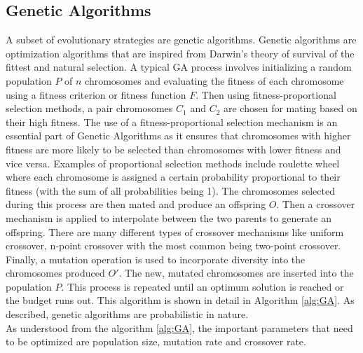 \documentclass{article}
\begin{document}
\subsection{Genetic Algorithms}
A subset of evolutionary strategies are genetic algorithms. Genetic algorithms are optimization algorithms that are inspired from Darwin's theory of survival of the fittest and natural selection. A typical GA process involves initializing a random population $P$ of $n$ chromosomes and evaluating the fitness of each chromosome using a fitness criterion or fitness function $F$. Then using fitness-proportional selection methods, a pair chromosomes $C_1$ and $C_2$ are chosen for mating based on their high fitness. The use of a fitness-proportional selection mechanism is an essential part of Genetic Algorithms as it ensures that chromosomes with higher fitness are more likely to be selected than chromosomes with lower fitness and vice versa. Examples of proportional selection methods include roulette wheel where each chromosome is assigned a certain probability proportional to their fitness (with the sum of all probabilities being 1). The chromosomes selected during this process are then mated and produce an offspring $O$. Then a crossover mechanism is applied to interpolate between the two parents to generate an offspring. There are many different types of crossover mechanisms like uniform crossover, n-point crossover with the most common being two-point crossover. Finally, a mutation operation is used to incorporate diversity into the chromosomes produced $O'$.  The new, mutated chromosomes are inserted into the population $P$. This process is repeated until an optimum solution is reached or the budget runs out. This algorithm is shown in detail in Algorithm \ref{alg:GA}. As described, genetic algorithms are probabilistic in nature. \\
As understood from the algorithm \ref{alg:GA}, the important parameters that need to be optimized are population size, mutation rate and crossover rate. \\
\end{document}
